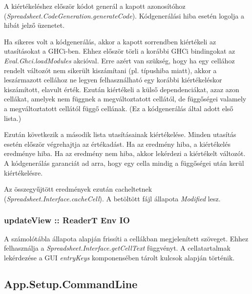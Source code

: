 A kiértékeléshez először kódot generál a kapott azonosítóhoz \mbox{(\textit{Spreadsheet.CodeGeneration.generateCode})}. Kódgenerálási hiba esetén logolja a hibát jelző üzenetet. 

Ha sikeres volt a kódgenerálás, akkor a kapott sorrendben kiértékeli az utasításokat a GHCi-ben. Ehhez először törli a korábbi GHCi bindingokat az \textit{Eval.Ghci.loadModules} akcióval. Erre azért van szükség, hogy ha egy cellához rendelt változót nem sikerült kiszámítani (pl. típushiba miatt), akkor a leszármazott cellához ne legyen felhasználható egy korábbi kiértékeléskor kiszámított, elavult érték. Ezután kiértékeli a külső dependenciákat, azaz azon cellákat, amelyek nem függnek a megváltoztatott cellától, de függőségei valamely  a megváltoztatott cellától függő cellának. (Ez a kódgenerálás által adott első lista.)

Ezután következik a második lista utasításainak kiértékelése. Minden utasítás esetén először végrehajtja az értékadást. Ha az eredmény hiba, a kiértékelés eredménye hiba. Ha az eredmény nem hiba, akkor lekérdezi a kiértékelt változót. A kódgenerálás garanciát ad arra, hogy egy cella mindig a függőségei után kerül kiértékelésre.

Az összegyűjtött eredmények ezután cacheltetnek \mbox{(\textit{Spreadsheet.Interface.cacheCell})}. A betöltött fájl állapota \textit{Modified} lesz.

\subsubsection{updateView :: ReaderT Env IO}

A számolótábla állapota alapján frissíti a cellákban megjelenített szöveget. Ehhez felhasználja a \textit{Spreadsheet.Interface.getCellText} függvényt. A cellatartalmak lekérdezése a GUI \textit{entryKeys} komponensében tárolt kulcsok alapján történik.

\subsection{App.Setup.CommandLine}

